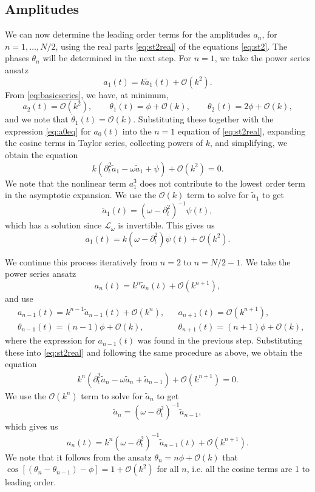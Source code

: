 \documentclass[11pt,reqno]{amsart}
\def\Lw{{\mathcal{L}_\omega}}
\begin{document}
\subsection{Amplitudes}

We can now determine the leading order terms for the amplitudes $a_n$, for $n = 1, \dots, N/2$, using the real parts \cref{eq:st2real} of the equations \cref{eq:st2}. The phases $\theta_n$ will be determined in the next step. For $n=1$, we take the power series ansatz 
\[
a_1(t) = k \tilde{a}_1(t) + \mathcal{O}(k^2).
\]
From \cref{eq:basicseries}, we have, at minimum,
\[
a_2(t) = \mathcal{O}(k^2), \qquad \theta_1(t) = \phi + \mathcal{O}(k), \qquad \theta_2(t) = 2 \phi + \mathcal{O}(k),
\]
and we note that $\dot \theta_1(t) = \mathcal{O}(k)$. Substituting these together with the expression \cref{eq:a0eq} for $a_0(t)$ into the $n=1$ equation of \cref{eq:st2real}, expanding the cosine terms in Taylor series, collecting powers of $k$, and simplifying, we obtain the equation
\[
k\left(\partial_t^2 \tilde{a}_1 - \omega \tilde{a}_1 + \psi\right) + \mathcal{O}(k^2) = 0.
\]
We note that the nonlinear term $a_1^3$ does not contribute to the lowest order term in the asymptotic expansion. We use the $\mathcal{O}(k)$ term to solve for $\tilde{a}_1$ to get 
\begin{equation}\label{eq:a11}
\tilde{a}_1(t) = (\omega - \partial_t^2)^{-1} \psi(t),
\end{equation}
which has a solution since $\Lw$ is invertible. This gives us
\begin{equation}\label{eq:a1eq}
a_1(t) = k (\omega - \partial_t^2) \psi(t) + \mathcal{O}(k^2).
\end{equation}

We continue this process iteratively from $n=2$ to $n=N/2-1$. We take the power series ansatz 
\[
a_n(t) = k^n \tilde{a}_n(t) + \mathcal{O}(k^{n+1}),
\]
and use
\begin{align*}
&a_{n-1}(t) = k^{n-1} \tilde{a}_{n-1}(t) + \mathcal{O}(k^{n}), &&a_{n+1}(t) = \mathcal{O}(k^{n+1}), \\
&\theta_{n-1}(t) = (n-1) \phi + \mathcal{O}(k), &&\theta_{n+1}(t) = (n+1) \phi + \mathcal{O}(k),
\end{align*}
where the expression for $a_{n-1}(t)$ was found in the previous step. Substituting these into \cref{eq:st2real} and following the same procedure as above, we obtain the equation
\begin{align*}
k^n\left(\partial_t^2 \tilde{a}_n - \omega \tilde{a}_n + \tilde{a}_{n-1} \right) +\mathcal{O}(k^{n+1}) = 0.
\end{align*}
We use the $\mathcal{O}(k^n)$ term to solve for $\tilde{a}_n$ to get 
\begin{equation}\label{eq:ann}
\tilde{a}_n = (\omega - \partial_t^2)^{-1}\tilde{a}_{n-1},
\end{equation}
which gives us
\begin{equation}\label{eq:aneq}
a_n(t) = k^n (\omega - \partial_t^2)^{-1} \tilde{a}_{n-1}(t) + \mathcal{O}(k^{n+1}).
\end{equation}
We note that it follows from the ansatz $\theta_n = n \phi + \mathcal{O}(k)$ that $\cos[(\theta_n - \theta_{n-1}) - \phi] = 1 + \mathcal{O}(k^2)$ for all $n$, i.e. all the cosine terms are 1 to leading order. 
\end{document}
